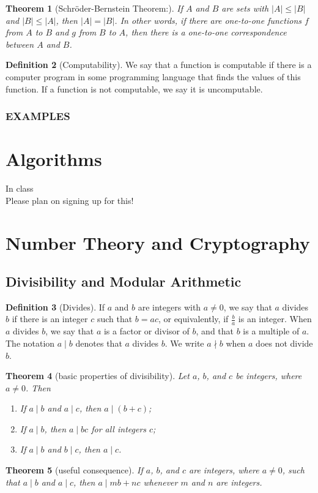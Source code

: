 \documentclass[letterpaper,10pt]{article}
\theoremstyle{plain}
\newtheorem{thm}{Theorem}[section]
\theoremstyle{definition}
\newtheorem{defn}[thm]{Definition}
\theoremstyle{remark}
\begin{document}
\begin{thm}[Schröder-Bernstein Theorem:] If $A$ and $B$ are sets with $|A| \leq |B|$ and $|B| \leq |A|$, then $|A| = |B|$. In other words, if there are one-to-one functions $f$ from $A$ to $B$ and $g$ from $B$ to $A$, then there is a one-to-one correspondence between $A$ and $B$.
\end{thm}
\begin{defn}[Computability]
We say that a function is computable if there is a computer program in some programming language that finds the values of this function. If a function is not computable, we say it is uncomputable.

\end{defn}
\newpage
\subsubsection{EXAMPLES}
\newpage
\section{Algorithms}
In class
\\
Please plan on signing up for this!
\newpage
\section{Number Theory and Cryptography}
\subsection{Divisibility and Modular Arithmetic}
\begin{defn}[Divides]
If \(a\) and \(b\) are integers with \(a \neq 0\), we say that \(a\) divides \(b\) if there is an integer \(c\) such that \(b = ac\), or equivalently, if \(\frac{b}{a}\) is an integer. When \(a\) divides \(b\), we say that \(a\) is a factor or divisor of \(b\), and that \(b\) is a multiple of \(a\). The notation \(a \mid b\) denotes that \(a\) divides \(b\). We write \(a \nmid b\) when \(a\) does not divide \(b\).

\end{defn}
\begin{thm}[basic properties of divisibility]
Let \(a\), \(b\), and \(c\) be integers, where \(a \neq 0\). Then
\begin{enumerate}
    \item[(i)] If \(a \mid b\) and \(a \mid c\), then \(a \mid (b + c)\);
    \item[(ii)] If \(a \mid b\), then \(a \mid bc\) for all integers \(c\);
    \item[(iii)] If \(a \mid b\) and \(b \mid c\), then \(a \mid c\).
\end{enumerate}

\end{thm}
\begin{thm}[useful consequence]
If \(a\), \(b\), and \(c\) are integers, where \(a \neq 0\), such that \(a \mid b\) and \(a \mid c\), then \(a \mid mb + nc\) whenever \(m\) and \(n\) are integers.


\end{thm}
\end{document}
